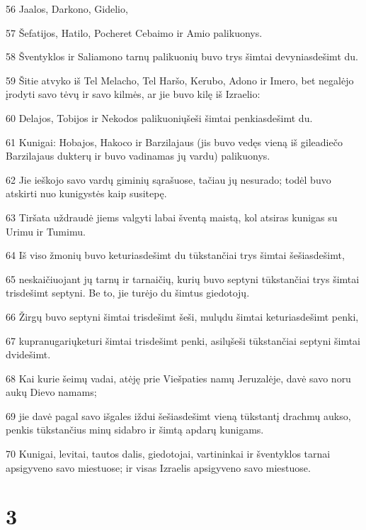 \par 56 Jaalos, Darkono, Gidelio, 
\par 57 Šefatijos, Hatilo, Pocheret Cebaimo ir Amio palikuonys. 
\par 58 Šventyklos ir Saliamono tarnų palikuonių buvo trys šimtai devyniasdešimt du. 
\par 59 Šitie atvyko iš Tel Melacho, Tel Haršo, Kerubo, Adono ir Imero, bet negalėjo įrodyti savo tėvų ir savo kilmės, ar jie buvo kilę iš Izraelio: 
\par 60 Delajos, Tobijos ir Nekodos palikuonių­šeši šimtai penkiasdešimt du. 
\par 61 Kunigai: Hobajos, Hakoco ir Barzilajaus (jis buvo vedęs vieną iš gileadiečo Barzilajaus dukterų ir buvo vadinamas jų vardu) palikuonys. 
\par 62 Jie ieškojo savo vardų giminių sąrašuose, tačiau jų nesurado; todėl buvo atskirti nuo kunigystės kaip susitepę. 
\par 63 Tiršata uždraudė jiems valgyti labai šventą maistą, kol atsiras kunigas su Urimu ir Tumimu. 
\par 64 Iš viso žmonių buvo keturiasdešimt du tūkstančiai trys šimtai šešiasdešimt, 
\par 65 neskaičiuojant jų tarnų ir tarnaičių, kurių buvo septyni tūkstančiai trys šimtai trisdešimt septyni. Be to, jie turėjo du šimtus giedotojų. 
\par 66 Žirgų buvo septyni šimtai trisdešimt šeši, mulų­du šimtai keturiasdešimt penki, 
\par 67 kupranugarių­keturi šimtai trisdešimt penki, asilų­šeši tūkstančiai septyni šimtai dvidešimt. 
\par 68 Kai kurie šeimų vadai, atėję prie Viešpaties namų Jeruzalėje, davė savo noru aukų Dievo namams; 
\par 69 jie davė pagal savo išgales iždui šešiasdešimt vieną tūkstantį drachmų aukso, penkis tūkstančius minų sidabro ir šimtą apdarų kunigams. 
\par 70 Kunigai, levitai, tautos dalis, giedotojai, vartininkai ir šventyklos tarnai apsigyveno savo miestuose; ir visas Izraelis apsigyveno savo miestuose.



\chapter{3}


